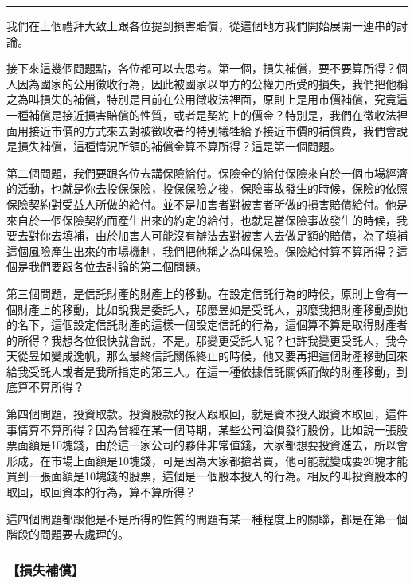 \documentclass[oneside,sub3section]{ctexbook}
\begin{document}
\begin{center}\rule{0.5\linewidth}{0.5pt}\end{center}

我們在上個禮拜大致上跟各位提到損害賠償，從這個地方我們開始展開一連串的討論。

接下來這幾個問題點，各位都可以去思考。第一個，損失補償，要不要算所得？個人因為國家的公用徵收行為，因此被國家以單方的公權力所受的損失，我們把他稱之為叫損失的補償，特別是目前在公用徵收法裡面，原則上是用市價補償，究竟這一種補償是接近損害賠償的性質，或者是契約上的價金？特別是，我們在徵收法裡面用接近市價的方式來去對被徵收者的特別犧牲給予接近市價的補償費，我們會說是損失補償，這種情況所領的補償金算不算所得？這是第一個問題。

第二個問題，我們要跟各位去講保險給付。保險金的給付保險來自於一個市場經濟的活動，也就是你去投保保險，投保保險之後，保險事故發生的時候，保險的依照保險契約對受益人所做的給付。並不是加害者對被害者所做的損害賠償給付。他是來自於一個保險契約而產生出來的約定的給付，也就是當保險事故發生的時候，我要去對你去填補，由於加害人可能沒有辦法去對被害人去做足額的賠償，為了填補這個風險產生出來的市場機制，我們把他稱之為叫保險。保險給付算不算所得？這個是我們要跟各位去討論的第二個問題。

第三個問題，是信託財產的財產上的移動。在設定信託行為的時候，原則上會有一個財產上的移動，比如說我是委託人，那麼昱如是受託人，那麼我把財產移動到她的名下，這個設定信託財產的這樣一個設定信託的行為，這個算不算是取得財產者的所得？我想各位很快就會説，不是。那變更受託人呢？也許我變更受託人，我今天從昱如變成逸帆，那么最終信託關係終止的時候，他又要再把這個財產移動回來給我受託人或者是我所指定的第三人。在這一種依據信託關係而做的財產移動，到底算不算所得？

第四個問題，投資取款。投資股款的投入跟取回，就是資本投入跟資本取回，這件事情算不算所得？因為曾經在某一個時期，某些公司溢價發行股份，比如說一張股票面額是10塊錢，由於這一家公司的夥伴非常值錢，大家都想要投資進去，所以會形成，在市場上面額是10塊錢，可是因為大家都搶著買，他可能就變成要20塊才能買到一張面額是10塊錢的股票，這個是一個股本投入的行為。相反的叫投資股本的取回，取回資本的行為，算不算所得？

這四個問題都跟他是不是所得的性質的問題有某一種程度上的關聯，都是在第一個階段的問題要去處理的。

\hypertarget{ux640dux5931ux88dcux511f}{%
\subsubsection{【損失補償】}\label{ux640dux5931ux88dcux511f}}
\end{document}
